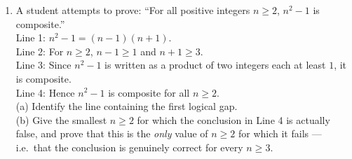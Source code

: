 \documentclass[11pt,a4paper]{article}
\begin{document}
\begin{enumerate}
\item A student attempts to prove: ``For all positive integers $n\geq2$, $n^2-1$ is composite.''\\
Line 1: $n^2-1=(n-1)(n+1)$.\\
Line 2: For $n\geq2$, $n-1\geq1$ and $n+1\geq3$.\\
Line 3: Since $n^2-1$ is written as a product of two integers each at least $1$, it is composite.\\
Line 4: Hence $n^2-1$ is composite for all $n\geq2$.\\
(a) Identify the line containing the first logical gap.\\
(b) Give the smallest $n\geq2$ for which the conclusion in Line 4 is actually false, and prove that this is the \emph{only} value of $n\geq2$ for which it fails --- i.e.\ that the conclusion is genuinely correct for every $n\geq3$.

\end{enumerate}

\end{document}
